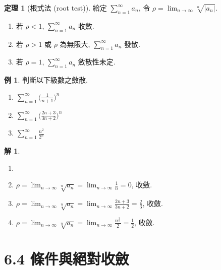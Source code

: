 \documentclass[12pt]{extarticle}
\newcommand{\ds}{\displaystyle}
\theoremstyle{definition}
\newtheorem*{thm}{定理}
\newtheorem*{ex}{例}
\newtheorem*{sol}{解}
\begin{document}
\begin{thm}[根式法 (root test)]
  給定 $\ds\sum_{n = 1}^\infty a_n$, 令 $\ds\rho = \lim_{n\to\infty}\sqrt[n]{|a_n|}$. 
  \begin{multicols}{2}
    \begin{enumerate}\setlength{\itemsep}{0pt}
      \item 若 $\ds\rho < 1$, $\ds\sum_{n = 1}^\infty a_n$ 收斂. 
      \item 若 $\ds\rho > 1$ 或 $\ds\rho$ 為無限大, $\ds\sum_{n = 1}^\infty a_n$ 發散. 
      \item 若 $\ds\rho = 1$, $\ds\sum_{n = 1}^\infty a_n$ 斂散性未定. 
    \end{enumerate}
  \end{multicols}
\end{thm}

\begin{ex} 判斷以下級數之斂散. 
  \begin{multicols}{3}
    \begin{enumerate}\setlength{\itemsep}{0pt}
      \item $\ds\sum_{n = 1}^\infty\Big(\frac{1}{n + 1}\Big)^n$
      \item $\ds\sum_{n = 1}^\infty\Big(\frac{2 n + 3}{3n + 2}\Big)^n$
      \item $\ds\sum_{n = 1}^\infty\frac{n^2}{2^n}$
    \end{enumerate}
  \end{multicols}
\end{ex}

\begin{sol}
  \begin{enumerate}\setlength{\itemsep}{0pt}
    \item[]
    \item $\ds\rho = \lim_{n\to\infty}\sqrt[n]{a_n} = \lim_{n\to\infty}\frac{1}{n} = 0$, 收斂. 
    \item $\ds\rho = \lim_{n\to\infty}\sqrt[n]{a_n} = \lim_{n\to\infty}\frac{2 n + 3}{3 n + 2} = \frac{2}{3}$, 收斂. 
    \item $\ds\rho = \lim_{n\to\infty}\sqrt[n]{a_n} = \lim_{n\to\infty}\frac{n^{\frac{2}{n}}}{2} = \frac{1}{2}$, 收斂. 
  \end{enumerate}
\end{sol}

\section*{6.4 條件與絕對收斂}
\end{document}
